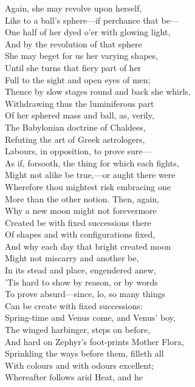 Again, she may revolve upon herself,\\
Like to a ball's sphere—if perchance that be—\\
One half of her dyed o'er with glowing light,\\
And by the revolution of that sphere\\
She may beget for us her varying shapes,\\
Until she turns that fiery part of her\\
Full to the sight and open eyes of men;\\
Thence by slow stages round and back she whirls,\\
Withdrawing thus the luminiferous part\\
Of her sphered mass and ball, as, verily,\\
The Babylonian doctrine of Chaldees,\\
Refuting the art of Greek astrologers,\\
Labours, in opposition, to prove sure—\\
As if, forsooth, the thing for which each fights,\\
Might not alike be true,—or aught there were\\
Wherefore thou mightest risk embracing one\\
More than the other notion. Then, again,\\
Why a new moon might not forevermore\\
Created be with fixed successions there\\
Of shapes and with configurations fixed,\\
And why each day that bright created moon\\
Might not miscarry and another be,\\
In its stead and place, engendered anew,\\
'Tis hard to show by reason, or by words\\
To prove absurd—since, lo, so many things\\
Can be create with fixed successions:\\
Spring-time and Venus come, and Venus' boy,\\
The winged harbinger, steps on before,\\
And hard on Zephyr's foot-prints Mother Flora,\\
Sprinkling the ways before them, filleth all\\
With colours and with odours excellent;\\
Whereafter follows arid Heat, and he\\
